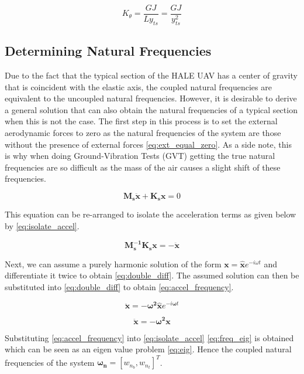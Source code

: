 \begin{equation}
    \label{eq:torsion_stiffness}
    K_\theta = \frac{GJ}{L y_{ts}} = \frac{GJ}{y_{ts}^2}
\end{equation}

\subsection{Determining Natural Frequencies}
Due to the fact that the typical section of the HALE UAV has a center of
gravity that is coincident with the elastic axis, the coupled natural
frequencies are equivalent to the uncoupled natural frequencies. However, it is
desirable to derive a general solution that can also obtain the natural
frequencies of a typical section when this is not the case. The first step in
this process is to set the external aerodynamic forces to zero as the natural
frequencies of the system are those without the presence of external forces
\cref{eq:ext_equal_zero}. As a side note, this is why when doing
Ground-Vibration Tests (GVT) getting the true natural frequencies are so
difficult as the mass of the air causes a slight shift of these frequencies.

\begin{equation}
    \label{eq:ext_equal_zero}
    \bm{M_s\ddot{x}} + \bm{K_s x} = 0
\end{equation}

This equation can be re-arranged to isolate the acceleration terms as given
below by \cref{eq:isolate_accel}.

\begin{equation}
    \label{eq:isolate_accel}
    \bm{M_s^{-1} K_s x} = -\bm{\ddot{x}}
\end{equation}

Next, we can assume a purely harmonic solution of the form
$\bm{x} = \bm{\hat{x}}e^{-i \omega t}$ and differentiate it twice to obtain
\cref{eq:double_diff}. The assumed solution can then be substituted into
\cref{eq:double_diff} to obtain \cref{eq:accel_frequency}.

\begin{equation}
    \label{eq:double_diff}
    \bm{\ddot{x}} = -\bm{\omega^2\hat{x}}e^{-i \bm{\omega} t}
\end{equation}

\begin{equation}
    \label{eq:accel_frequency}
    \bm{\ddot{x}} = -\bm{\omega^2 x}
\end{equation}

Substituting \cref{eq:accel_frequency} into \cref{eq:isolate_accel}
\cref{eq:freq_eig} is obtained which can be seen as an eigen value problem
\cref{eq:eig}. Hence the coupled natural frequencies of the system
$\bm{\omega_n} = \left[w_{n_b}, w_{n_t}\right]^T$.

